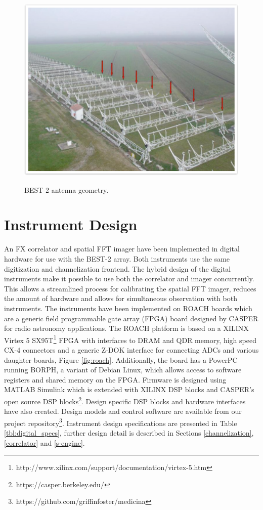 \documentclass[useAMS,macros,usenatbib,onecolumn]{mn2e}
\begin{document}
\begin{figure}
{    \includegraphics[scale=0.4]{graphics/best2.pdf}
    \label{fig:best2}
    }
    \caption{BEST-2 antenna geometry.}
    \label{fig:array_layout}
\end{figure}

\section{Instrument Design}
\label{instrument design}

An FX correlator and spatial FFT imager have been implemented in digital hardware for use with the BEST-2 array.
Both instruments use the same digitization and channelization frontend.
The hybrid design of the digital instruments make it possible to use both the correlator and imager concurrently.
This allows a streamlined process for calibrating the spatial FFT imager, reduces the amount of hardware and allows for simultaneous observation with both instruments.
The instruments have been implemented on ROACH boards which are a generic field programmable gate array (FPGA) board designed by CASPER for radio astronomy applications.
The ROACH platform is based on a XILINX Virtex 5 SX95T\footnote{http://www.xilinx.com/support/documentation/virtex-5.htm} FPGA with interfaces to DRAM and QDR memory, high speed CX-4 connectors and a generic Z-DOK interface for connecting ADCs and various daughter boards, Figure \ref{fig:roach}.
Additionally, the board has a PowerPC running BORPH, a variant of Debian Linux, which allows access to software registers and shared memory on the FPGA.
Firmware is designed using MATLAB Simulink which is extended with XILINX DSP blocks and CASPER's open source DSP blocks\footnote{https://casper.berkeley.edu/}.
Design specific DSP blocks and hardware interfaces have also created.
Design models and control software are available from our project repository\footnote{https://github.com/griffinfoster/medicina}.
Instrument design specifications are presented in Table \ref{tbl:digital_specs}, further design detail is described in Sections \ref{channelization}, \ref{correlator} and \ref{s-engine}.
\end{document}
